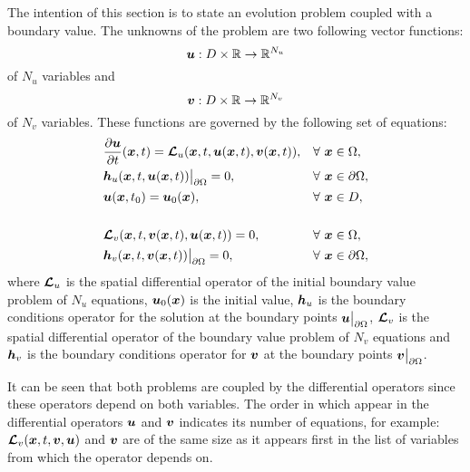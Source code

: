The intention of this section is to state an evolution problem coupled with a boundary value. The unknowns of the  problem are  two following vector functions:  
              $$ 
              \boldsymbol{u}: D \times \mathbb{R}\rightarrow \mathbb{R}^{N_u}
              $$ 
of $N_u$ variables and 
              $$ 
              \boldsymbol{v}: D \times \mathbb{R}\rightarrow \mathbb{R}^{N_v}
              $$
of $N_v$ variables. These  functions are governed by the following set of equations: 
              \begin{align}
              & \frac{\partial \boldsymbol{u} }{\partial t}(\boldsymbol{x},t) =\boldsymbol{\mathcal{L}}_u (\boldsymbol{x},t,\boldsymbol{u}(\boldsymbol{x},t),\boldsymbol{v}(\boldsymbol{x},t)) ,   & \forall & \ \boldsymbol{x} \in  \Omega, \label{ibvp_bvp1} \\
              & \boldsymbol{h}_u (\boldsymbol{x},t,\boldsymbol{u}(\boldsymbol{x},t))\big\rvert_{\partial \Omega}=0 , & \forall & \ \boldsymbol{x} \in \partial \Omega, \\ 
              & \boldsymbol{u}(\boldsymbol{x},t_0)=\boldsymbol{u}_0(\boldsymbol{x}),  & \forall & \ \boldsymbol{x} \in  D, \\ \\
              & \boldsymbol{\mathcal{L}}_v (\boldsymbol{x},t,\boldsymbol{v}(\boldsymbol{x},t),\boldsymbol{u}(\boldsymbol{x},t)) = 0 ,  & \forall & \ \boldsymbol{x} \in  \Omega, \\
              & \boldsymbol{h}_v (\boldsymbol{x},t,\boldsymbol{v}(\boldsymbol{x},t))\big\rvert_{\partial \Omega}=0 , & \forall & \ \boldsymbol{x} \in \partial \Omega,\label{ibvp_bvp2}
              \end{align}
where $\boldsymbol{\mathcal{L}}_u$ is the spatial differential operator of the initial boundary  value problem of $N_u$ equations, $\boldsymbol{u}_0(\boldsymbol{x})$ is the initial value, $\boldsymbol{h}_u$ is the boundary conditions operator for the solution at the boundary points $\boldsymbol{u} \big\rvert_{\partial \Omega}$,  $\boldsymbol{\mathcal{L}}_v$ is the spatial differential operator of the boundary value problem of $N_v$ equations and $\boldsymbol{h}_v$ is the boundary conditions operator for $\boldsymbol{v}$  at the boundary points $\boldsymbol{v} \big\rvert_{\partial \Omega}$. 
              
It can be seen that both problems are coupled by the differential operators since these operators depend on both variables. The order in which appear in the differential operators $\boldsymbol{u}$ and $\boldsymbol{v}$ indicates its number of equations, for example: $\boldsymbol{\mathcal{L}}_v(\boldsymbol{x},t,\boldsymbol{v},\boldsymbol{u})$ and $\boldsymbol{v}$ are of the same size as it appears first in the list of variables from which the operator depends on.
              
